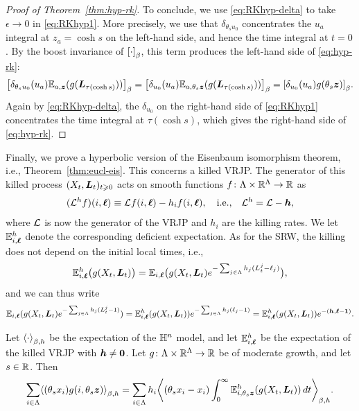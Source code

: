 \documentclass[11pt,a4paper]{article}
\begin{document}
\begin{proof}[ Proof of Theorem~\ref{thm:hyp-rk}]
To conclude, we use \eqref{eq:RKhyp-delta} to take $\epsilon\to 0$
in \eqref{eq:RKhyp1}. More precisely, we use that
$\delta_{\theta_{s}u_{0}}$ concentrates the $u_a$ integral at
$z_{a}=\cosh s$ on the left-hand side, and hence the time integral at $t = 0$.
By the boost invariance of $\uspin{\cdot}_{\beta}$, 
this term produces  the left-hand side of \eqref{eq:hyp-rk}: 
  \begin{equation}
    \uspin{\delta_{\theta_su_0}(u_a)\E_{a,\V{z}}(g(\V{L}_{\tau(\cosh s)}))}_{\beta}
    =
    \uspin{\delta_{u_0}(u_a) \E_{a,\theta_s\V{z}}(g(\V{L}_{\tau(\cosh s)}))}_{\beta}
    =
    \uspin{\delta_{u_0}(u_a) g(\theta_{s}\V{z})}_{\beta} 
    .
  \end{equation}
  Again by \eqref{eq:RKhyp-delta}, the
  $\delta_{u_{0}}$ on the right-hand side of \eqref{eq:RKhyp1} concentrates the time integral at
  $\tau(\cosh s)$, which gives the right-hand side of \eqref{eq:hyp-rk}.
\end{proof}	

Finally, we prove a hyperbolic version of the Eisenbaum isomorphism
theorem, i.e., Theorem~\ref{thm:eucl-eis}. This concerns a killed
VRJP. The generator of this killed process
$(X_{t},\boldsymbol{L}_{t})_{t\geqslant 0}$ acts on smooth functions
$f\colon \Lambda\times\mathbb{R}^{\Lambda}\to \mathbb{R}$ as
\begin{equation}
\label{eq:VRJP-gen-k}
(\mathcal L^{h} f)(i,\boldsymbol{\ell})
\equiv \mathcal L
f(i,\boldsymbol{\ell}) - h_{i}f(i,\boldsymbol{\ell}) 
,\quad \text{i.e.,}\quad
\mathcal L^h = \mathcal L - \boldsymbol{h},
\end{equation}
where $\mathcal L$ is now the generator of the VRJP and $h_i$ are the killing
rates. We let $\mathbb{E}^{h}_{i,\boldsymbol{\ell}}$ denote the corresponding deficient
expectation.  As for the SRW, the killing does not depend on the initial
local times, i.e.,
\begin{equation}
  \label{eq:VRJP-gen-k-1}
  \mathbb{E}^{h}_{i,\boldsymbol{\ell}} \bigl({g(X_{t},\boldsymbol{L}_{t})}\bigr) 
  = 
  \mathbb{E}_{i,\boldsymbol{\ell}}\bigl({g(X_{t},\boldsymbol{L}_{t})e^{-\sum_{j\in\Lambda}h_{j}(L^{j}_{t}-\ell_j)}}\bigr),
\end{equation}
and we can thus write
\begin{equation}
  \label{eq:VRJP-nokill}
  \mathbb{E}_{i,\boldsymbol{\ell}}(g(X_t,\boldsymbol{L}_t)e^{-\sum_{j\in\Lambda} h_j(L_t^j-1)})
  = \mathbb{E}_{i,\boldsymbol{\ell}}^h(g(X_t,\boldsymbol{L}_t))e^{-\sum_{j\in\Lambda} h_j (\ell_j-1)}
  = \mathbb{E}_{i,\boldsymbol{\ell}}^h(g(X_t,\boldsymbol{L}_t))e^{-(\boldsymbol{h}, \boldsymbol{\ell}-\boldsymbol{1})}
  .
\end{equation}

\begin{theorem}
  \label{thm:EIS-VRJP}
  Let $\spin{\cdot}_{\beta,h}$ be the expectation of the $\mathbb{H}^n$
  model, and let $\mathbb{E}_{i,\boldsymbol{\ell}}^h$ be the expectation of the killed
  VRJP with $\boldsymbol{h} \neq \boldsymbol{0}$.  Let
  $g\colon\Lambda\times\mathbb{R}^{\Lambda}\to \mathbb{R}$ be of moderate growth, and
  let $s\in\mathbb{R}$. Then
  \begin{equation}
    \label{eq:EIS-VRJP-g}
    \sum_{i\in\Lambda}\spin{(\theta_{s}x_{i})
      g(i,\theta_{s}\V{z})}_{\beta,h} =
    \sum_{i\in\Lambda}h_{i}\spin{(\theta_{s}x_{i}-x_{i})
      \int_{0}^{\infty} \E_{i,\theta_{s}\V{z}}^{h}
      (g(X_{t},\V{L}_{t})
      )\,dt}_{\beta,h}.
  \end{equation}
\end{theorem}
\end{document}
